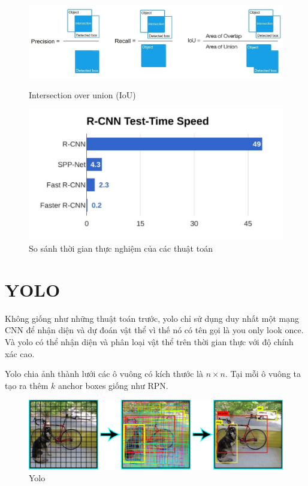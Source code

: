 \begin{figure}[H]
\begin{center}
\label{fig:iou}
\includegraphics[scale=0.4]{chap4/image/iou.jpg}
\caption{Intersection over union (IoU)}
\end{center}
\end{figure}
	
\begin{figure}[H]
\begin{center}
\includegraphics[scale=0.6]{chap4/image/hieusuat2.png}
\caption{So sánh thời gian thực nghiệm của các thuật toán}
\end{center}
\end{figure}
\section{YOLO}
Không giống như những thuật toán trước, yolo chỉ sử dụng duy nhất một mạng CNN để nhận diện và dự đoán vật thể vì thế nó có tên gọi là you only look once. Và yolo có thể nhận diện và phân loại vật thể trên thời gian thực với độ chính xác cao.\par
Yolo chia ảnh thành lưới các ô vuông có kích thước là $n\times n $. Tại mỗi ô vuông ta tạo ra thêm $k$ anchor boxes giống như RPN.
\begin{figure}[H]
\begin{center}
\includegraphics[scale=0.3]{chap4/image/yolo1.png}
\end{center}
\caption{Yolo}
\end{figure}


